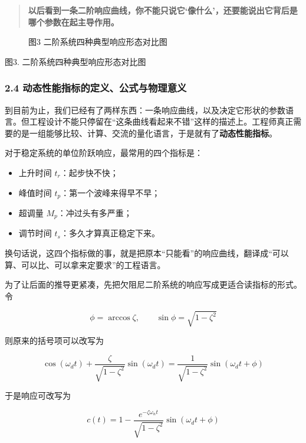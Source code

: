 \documentclass[
  11pt]{article}
\providecommand{\tightlist}{%
  \setlength{\itemsep}{0pt}\setlength{\parskip}{0pt}}
\begin{document}
\begin{quote}
\textbf{以后看到一条二阶响应曲线，你不能只说它`像什么'，还要能说出它背后是哪个参数在起主导作用。}
\end{quote}

\begin{figure}
\centering

\caption{图3 二阶系统四种典型响应形态对比图}
\end{figure}

图3. 二阶系统四种典型响应形态对比图

\subsubsection{2.4
动态性能指标的定义、公式与物理意义}\label{ux52a8ux6001ux6027ux80fdux6307ux6807ux7684ux5b9aux4e49ux516cux5f0fux4e0eux7269ux7406ux610fux4e49}

到目前为止，我们已经有了两样东西：一条响应曲线，以及决定它形状的参数语言。但工程设计不能只停留在``这条曲线看起来不错''这样的描述上。工程师真正需要的是一组能够比较、计算、交流的量化语言，于是就有了\textbf{动态性能指标}。

对于稳定系统的单位阶跃响应，最常用的四个指标是：

\begin{itemize}
\tightlist
\item
  上升时间 \(t_r\)：起步快不快；
\item
  峰值时间 \(t_p\)：第一个波峰来得早不早；
\item
  超调量 \(M_p\)：冲过头有多严重；
\item
  调节时间 \(t_s\)：多久才算真正稳定下来。
\end{itemize}

换句话说，这四个指标做的事，就是把原本``只能看''的响应曲线，翻译成``可以算、可以比、可以拿来定要求''的工程语言。

为了让后面的推导更紧凑，先把欠阻尼二阶系统的响应写成更适合读指标的形式。令

\[
\phi = \arccos \zeta, \qquad \sin\phi = \sqrt{1-\zeta^2}
\]

则原来的括号项可以改写为

\[
\cos(\omega_d t) + \frac{\zeta}{\sqrt{1-\zeta^2}}\sin(\omega_d t)
= \frac{1}{\sqrt{1-\zeta^2}}\sin(\omega_d t + \phi)
\]

于是响应可改写为

\[
c(t) = 1 - \frac{e^{-\zeta\omega_n t}}{\sqrt{1-\zeta^2}}\sin(\omega_d t + \phi)
\]
\end{document}
